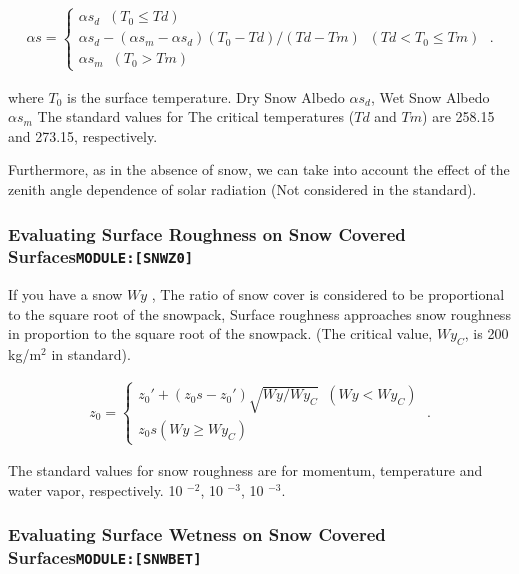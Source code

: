 \begin{eqnarray}
  \alpha s = \left\{
    \begin{array}{ll}
      \alpha s_d                         \;\; (T_0 \le Td) \\
      \alpha s_d - (\alpha s_m -\alpha s_d)
                   (T_0 - Td)/(Td - Tm)  \;\; (Td < T_0 \le Tm) \\
      \alpha s_m                         \;\; (T_0 > Tm)
    \end{array}
  \right. \; .
\end{eqnarray}

where \(T_0\) is the surface temperature. Dry Snow Albedo
\(\alpha s_d\), Wet Snow Albedo \(\alpha s_m\) The standard values for
The critical temperatures (\(Td\) and \(Tm\)) are 258.15 and 273.15,
respectively.

Furthermore, as in the absence of snow, we can take into account the
effect of the zenith angle dependence of solar radiation (Not considered
in the standard).

\hypertarget{evaluating-surface-roughness-on-snow-covered-surfacesmodulesnwz0}{%
\subsubsection{\texorpdfstring{Evaluating Surface Roughness on Snow
Covered
Surfaces\texttt{MODULE:{[}SNWZ0{]}}}{Evaluating Surface Roughness on Snow Covered SurfacesMODULE:{[}SNWZ0{]}}}\label{evaluating-surface-roughness-on-snow-covered-surfacesmodulesnwz0}}

If you have a snow \(Wy\) , The ratio of snow cover is considered to be
proportional to the square root of the snowpack, Surface roughness
approaches snow roughness in proportion to the square root of the
snowpack. (The critical value, \(Wy_C\), is 200 kg/m\(^2\) in standard).

\begin{eqnarray}
  z_0 = \left\{ 
  \begin{array}{ll}
    z_0' + (z_0s-z_0')\sqrt{Wy/Wy_{C}}  \;\;   (Wy < Wy_{C}) \\
    z_0s                                       (Wy \ge Wy_{C})
  \end{array}
  \right. \; .
\end{eqnarray}

The standard values for snow roughness are for momentum, temperature and
water vapor, respectively. 10 \(^{-2}\), 10 \(^{-3}\), 10 \(^{-3}\).

\hypertarget{evaluating-surface-wetness-on-snow-covered-surfacesmodulesnwbet}{%
\subsubsection{\texorpdfstring{Evaluating Surface Wetness on Snow
Covered
Surfaces\texttt{MODULE:{[}SNWBET{]}}}{Evaluating Surface Wetness on Snow Covered SurfacesMODULE:{[}SNWBET{]}}}\label{evaluating-surface-wetness-on-snow-covered-surfacesmodulesnwbet}}

